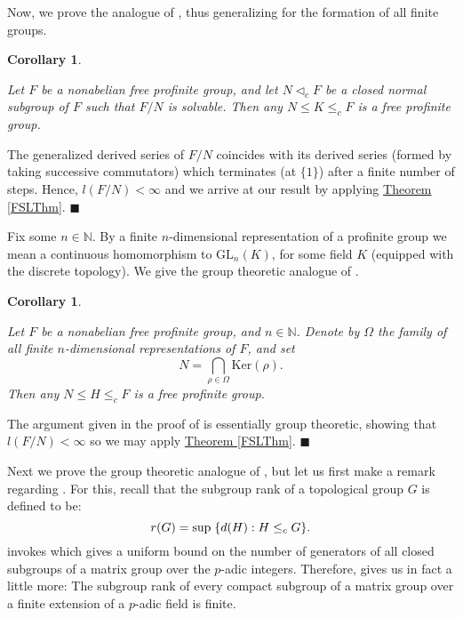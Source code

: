 \documentclass[12pt,a4paper]{article}
\newtheorem{corollary}[theorem]{Corollary}
\newenvironment{proof}[1][Proof]{\begin{trivlist}
\item[\hskip \labelsep {\bfseries #1}]}{\end{trivlist}}
\newcommand{\thmref}[1]{\hyperref[#1]{Theorem \ref*{#1}}}
\begin{document}
Now, we prove the analogue of \cite[Theorem 5.3]{BFW}, thus generalizing \cite[Corollary 8.9.3]{RZ} for the formation of all finite groups.

\begin{corollary} \label{SolveCor}

Let $F$ be a nonabelian free profinite group, and let $N \lhd_c F$ be a closed normal subgroup of $F$ such that $F/N$ is solvable. Then any $N \leq K \leq_c F$ is a free profinite group. 

\end{corollary}

\begin{proof}

The generalized derived series of $F/N$ coincides with its derived series (formed by taking successive commutators) which terminates (at $\{1\}$) after a finite number of steps. Hence, $l(F/N) < \infty$ and we arrive at our result by applying \thmref{FSLThm}. $\blacksquare$

\end{proof}

Fix some $n \in \mathbb{N}$. By a finite $n$-dimensional representation of a profinite group we mean a continuous homomorphism to $\mathrm{GL}_n(K)$, for some field $K$ (equipped with the discrete topology). We give the group theoretic analogue of \cite[Theorem 5.1]{BFW}.

\begin{corollary} \label{FiniteRepsCor}

Let $F$ be a nonabelian free profinite group, and $n \in \mathbb{N}$. Denote
by $\Omega$ the family of all finite $n$-dimensional representations of $F$, and set $$N = \bigcap_{\rho \in \Omega} \mathrm{Ker}(\rho).$$ Then any $N \leq H \leq_c F$ is a free profinite group.

\end{corollary}

\begin{proof}

The argument given in the proof of \cite[Theorem 5.1]{BFW} is essentially group theoretic, showing that $l(F/N) < \infty$ so we may apply \thmref{FSLThm}. $\blacksquare$

\end{proof}

Next we prove the group theoretic analogue of \mbox{\cite[Theorem 1.2]{BFW}}, but let us first make a remark regarding \mbox{\cite[Lemma 4.3]{BFW}}. For this, recall that the subgroup rank of a topological group $G$ is defined to be: $$ r(G) = \sup \hspace{1mm} \{d(H) : H \leq_c G \}.$$ \cite[Lemma 4.3]{BFW} invokes \cite[Proposition 22.14.4]{FJ} which gives a uniform bound on the number of generators of all closed subgroups of a matrix group over the $p$-adic integers. Therefore, \mbox{\cite[Lemma 4.3]{BFW}} gives us in fact a little more: The subgroup rank of every compact subgroup of a matrix group over a finite extension of a $p$-adic field is finite. 
\end{document}
